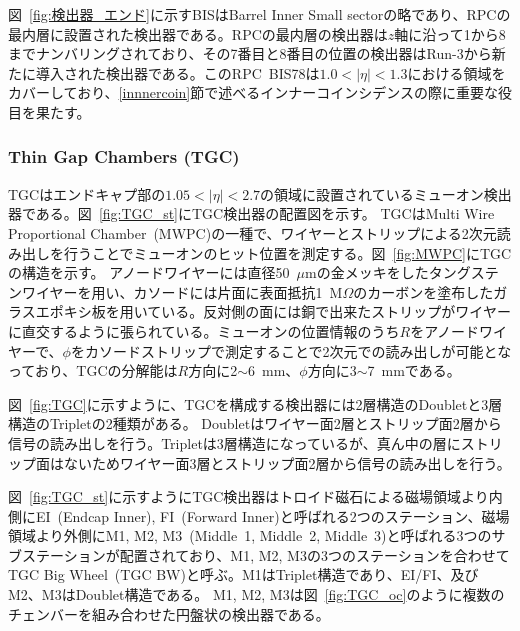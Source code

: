 図~\ref{fig:検出器_エンド}に示すBISはBarrel Inner Small sectorの略であり、RPCの最内層に設置された検出器である。RPCの最内層の検出器は$z$軸に沿って1から8までナンバリングされており、その7番目と8番目の位置の検出器はRun-3から新たに導入された検出器である。このRPC~BIS78は$1.0 < |\eta| < 1.3$における領域をカバーしており、\ref{innnercoin}節で述べるインナーコインシデンスの際に重要な役目を果たす。

\subsubsection{Thin Gap Chambers (TGC)}
TGCはエンドキャプ部の$1.05 < |\eta| < 2.7$の領域に設置されているミューオン検出器である。図~\ref{fig:TGC_st}にTGC検出器の配置図を示す。
TGCはMulti Wire Proportional Chamber~(MWPC)の一種で、ワイヤーとストリップによる2次元読み出しを行うことでミューオンのヒット位置を測定する。図~\ref{fig:MWPC}にTGCの構造を示す。
アノードワイヤーには直径50~$\mu$mの金メッキをしたタングステンワイヤーを用い、カソードには片面に表面抵抗1~M$\Omega$のカーボンを塗布したガラスエポキシ板を用いている。反対側の面には銅で出来たストリップがワイヤーに直交するように張られている。ミューオンの位置情報のうち$R$をアノードワイヤーで、$\phi$をカソードストリップで測定することで2次元での読み出しが可能となっており、TGCの分解能は$R$方向に2$\sim$6~mm、$\phi$方向に3$\sim$7~mmである。

図~\ref{fig:TGC}に示すように、TGCを構成する検出器には2層構造のDoubletと3層構造のTripletの2種類がある。
Doubletはワイヤー面2層とストリップ面2層から信号の読み出しを行う。Tripletは3層構造になっているが、真ん中の層にストリップ面はないためワイヤー面3層とストリップ面2層から信号の読み出しを行う。

図~\ref{fig:TGC_st}に示すようにTGC検出器はトロイド磁石による磁場領域より内側にEI~(Endcap Inner), FI~(Forward Inner)と呼ばれる2つのステーション、磁場領域より外側にM1, M2, M3~(Middle~1, Middle~2, Middle~3)と呼ばれる3つのサブステーションが配置されており、M1, M2, M3の3つのステーションを合わせてTGC Big Wheel~(TGC BW)と呼ぶ。M1はTriplet構造であり、EI/FI、及びM2、M3はDoublet構造である。
M1, M2, M3は図~\ref{fig:TGC_oc}のように複数のチェンバーを組み合わせた円盤状の検出器である。

